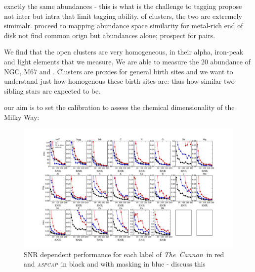 \documentclass[14pt, preprint2]{aastex6}
\newcommand{\project}[1]{\textsl{#1}}
\newcommand{\tc}{\project{The~Cannon}}
\newcommand{\apogee}{\project{\textsc{apogee}}}
\newcommand{\aspcap}{\project{\textsc{aspcap}}}
\begin{document}
 exactly the same abundances - this is what is the challenge to tagging 
propose not inter but intra that limit tagging ability.
of clusters, the two are extremely simimalr. 
proceed to mapping abundance space similarity for metal-rich end of disk not find common orign but abundances alone; prospect for pairs. 

We find that the open clusters are very homogeneous, in their alpha, iron-peak and light elements that we measure. We are able to measure the 20 abundance of NGC, M67 and . Clusters are proxies for general birth sites and we want to understand just how homogenous these birth sites are: thus how similar two sibling stars are expected to be. 

 our aim is to set the calibration to assess the chemical dimensionality of the Milky Way:





\begin{figure}[h!]
\includegraphics[scale=0.45]{rms_snr_both_dr132.pdf} 
  \caption{SNR dependent performance for each label of \tc\ in red and \aspcap\ in black and with masking in blue - discuss this}
\label{fig:snr_error}
\end{figure}


\end{document}
